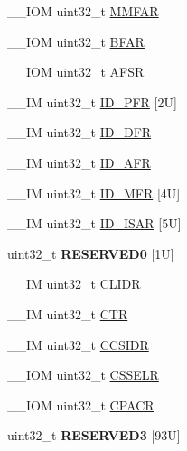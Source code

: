 \begin{DoxyCompactItemize}
\+\_\+\+\_\+\+I\+OM uint32\+\_\+t \mbox{\hyperlink{structSCB__Type_a2d03d0b7cec2254f39eb1c46c7445e80}{M\+M\+F\+AR}}
\item 
\+\_\+\+\_\+\+I\+OM uint32\+\_\+t \mbox{\hyperlink{structSCB__Type_a3f8e7e58be4e41c88dfa78f54589271c}{B\+F\+AR}}
\item 
\+\_\+\+\_\+\+I\+OM uint32\+\_\+t \mbox{\hyperlink{structSCB__Type_ab65372404ce64b0f0b35e2709429404e}{A\+F\+SR}}
\item 
\+\_\+\+\_\+\+IM uint32\+\_\+t \mbox{\hyperlink{structSCB__Type_ab35c6b650d3bb2d11259c0a0285d0d00}{I\+D\+\_\+\+P\+FR}} \mbox{[}2\+U\mbox{]}
\item 
\+\_\+\+\_\+\+IM uint32\+\_\+t \mbox{\hyperlink{structSCB__Type_ada1d3119c020983fdc949c2ccd406caa}{I\+D\+\_\+\+D\+FR}}
\item 
\+\_\+\+\_\+\+IM uint32\+\_\+t \mbox{\hyperlink{structSCB__Type_a9c9a1d805f8e99b9fd3ab4f455b6333a}{I\+D\+\_\+\+A\+FR}}
\item 
\+\_\+\+\_\+\+IM uint32\+\_\+t \mbox{\hyperlink{structSCB__Type_a781ef24d88610a432e7d5b179d78de47}{I\+D\+\_\+\+M\+FR}} \mbox{[}4\+U\mbox{]}
\item 
\+\_\+\+\_\+\+IM uint32\+\_\+t \mbox{\hyperlink{structSCB__Type_ac729a357cdd968020fdb5c35bdfc4916}{I\+D\+\_\+\+I\+S\+AR}} \mbox{[}5\+U\mbox{]}
\item 
\mbox{\label{structSCB__Type_ae649790700f03a5ba8294084b2b6926c}} 
uint32\+\_\+t {\bfseries R\+E\+S\+E\+R\+V\+E\+D0} \mbox{[}1\+U\mbox{]}
\item 
\+\_\+\+\_\+\+IM uint32\+\_\+t \mbox{\hyperlink{structSCB__Type_ad9899f5775251cf5ef0cb0845527afc2}{C\+L\+I\+DR}}
\item 
\+\_\+\+\_\+\+IM uint32\+\_\+t \mbox{\hyperlink{structSCB__Type_af3fe705fef8762763b6d61dbdf0ccc3d}{C\+TR}}
\item 
\+\_\+\+\_\+\+IM uint32\+\_\+t \mbox{\hyperlink{structSCB__Type_afd063c9297a1a3b67e6d1d5e179e6a0e}{C\+C\+S\+I\+DR}}
\item 
\+\_\+\+\_\+\+I\+OM uint32\+\_\+t \mbox{\hyperlink{structSCB__Type_ad3884e8b6504ec63c1eaa8742e94df3d}{C\+S\+S\+E\+LR}}
\item 
\+\_\+\+\_\+\+I\+OM uint32\+\_\+t \mbox{\hyperlink{structSCB__Type_ac6a860c1b8d8154a1f00d99d23b67764}{C\+P\+A\+CR}}
\item 
\mbox{\label{structSCB__Type_aa55deef9278aed6826d5e1ae199a0d23}} 
uint32\+\_\+t {\bfseries R\+E\+S\+E\+R\+V\+E\+D3} \mbox{[}93\+U\mbox{]}

\end{DoxyCompactItemize}
